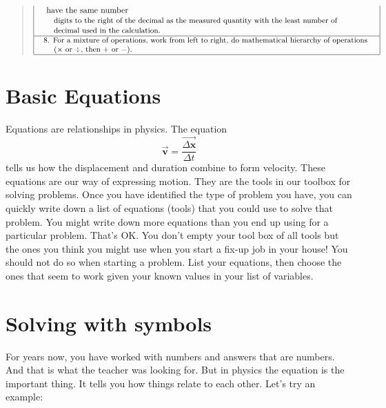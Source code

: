 \documentclass[]{Book}
\begin{document}
\begin{quotation}
\begin{equation*}
\begin{tabular}{|l|}
\begin{tabular}{l}
{					have the same number } \\ 
				{\small \quad\ digits to the right of the decimal as the measured quantity
					with the least number of } \\ 
				{\small \quad\ decimal used in the calculation. }%
			\end{tabular}%
			{\small \ } \\ \hline
			{\small 
				\begin{tabular}{l}
					8. For a mixture of operations, work from left to right, do mathematical
					hierarchy of operations \\ 
					\quad\ ($\times $\ or $\div ,$\ then $+$\ or $-$).%
				\end{tabular}
			} \\ \hline
		\end{tabular}%
	\end{equation*}
\end{quotation}

\section{Basic Equations}

Equations are relationships in physics. The equation 
\begin{equation*}
	\overrightarrow{\mathbf{v}}=\frac{\overrightarrow{\Delta \mathbf{x}}}{\Delta
		t}
\end{equation*}%
tells us how the displacement and duration combine to form velocity. These
equations are our way of expressing motion. They are the tools in our
toolbox for solving problems. Once you have identified the type of problem
you have, you can quickly write down a list of equations (tools) that you
could use to solve that problem. You might write down more equations than
you end up using for a particular problem. That's OK. You don't empty your
tool box of all tools but the ones you think you might use when you start a
fix-up job in your house! You should not do so when starting a problem. List
your equations, then choose the ones that seem to work given your known
values in your list of variables.

\section{Solving with symbols}

For years now, you have worked with numbers and answers that are numbers.
And that is what the teacher was looking for. But in physics the equation is
the important thing. It tells you how things relate to each other. Let's try
an example:
\end{document}
